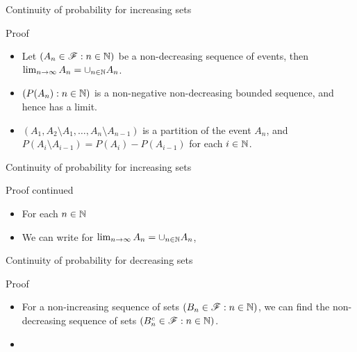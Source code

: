 \documentclass[12pt,aspectratio=169]{beamer}
\begin{document}
\begin{frame}{Continuity of probability for increasing sets}
    \begin{block}{Proof} 
    \begin{itemize}
        \item <1-> Let $(A_n \in \mathscr{F}: n \in \mathbb{N})$ be a non-decreasing sequence of events, 
        then $\lim_{n \to \infty}A_n = \cup_{n\in \mathbb{N}}A_n$. 
        \item <2-> $(P(A_n): n \in \mathbb{N})$ is a non-negative non-decreasing bounded sequence, and hence has a limit. 
        \item <3-> $(A_1, A_2\setminus A_1, \dots, A_n\setminus A_{n-1})$ is a partition of the event $A_n$, and $P(A_i\setminus A_{i-1}) = P(A_i) - P(A_{i-1})$ for each $i \in \mathbb{N}$.
    \end{itemize}
    \end{block}
\end{frame}

\begin{frame}{Continuity of probability for increasing sets}
    \begin{block}{Proof continued}
    \begin{itemize}
        \item <1-> For each $n \in \mathbb{N}$
        \item <2-> We can write for $\lim_{n \to \infty}A_n = \cup_{n \in \mathbb{N}}A_n$, 
    \end{itemize}
    \end{block}
\end{frame}

\begin{frame}{Continuity of probability for decreasing sets} 
    \begin{block}{Proof}
    \begin{itemize}
        \item <1-> For a non-increasing sequence of sets $(B_n \in \mathscr{F}: n \in \mathbb{N})$, 
        we can find the non-decreasing sequence of sets $(B^c_n \in \mathscr{F}: n \in \mathbb{N})$. 
        \item <2->
    \end{itemize}
    \end{block}
\end{frame}
    
\end{document}
